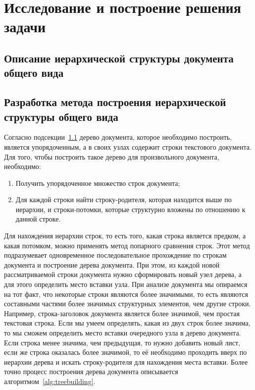 \section{Исследование и построение решения задачи}
\label{sec:Chapter3} 

\subsection{Описание иерархической структуры документа общего вида}
\label{subsec:structuredescription}

\subsection{Разработка метода построения иерархической структуры общего вида}
\label{subsec:extractmethod}

Согласно подсекции~\ref{subsec:structuredescription} дерево документа, которое необходимо построить,
является упорядоченным, а в своих узлах содержит строки текстового документа.
Для того, чтобы построить такое дерево для произвольного документа, необходимо:
\begin{enumerate}
    \item Получить упорядоченное множество строк документа;
    \item Для каждой строки найти строку-родителя, которая находится выше по иерархии, и строки-потомки, которые структурно вложены по отношению к данной строке.
\end{enumerate}
Для нахождения иерархии строк, то есть того, какая строка является предком, а какая потомком,
можно применять метод попарного сравнения строк.
Этот метод подразумевает одновременное последовательное прохождение по строкам документа и построение дерева документа.
При этом, из каждой новой рассматриваемой строки документа нужно сформировать новый узел дерева, а для этого определить место вставки узла.
При анализе документа мы опираемся на тот факт, что некоторые строки являются более значимыми,
то есть являются составными частями более значимых структурных элементов, чем другие строки.
Например, строка-заголовок документа является более значимой, чем простая текстовая строка.
Если мы умеем определять, какая из двух строк более значима, то мы сможем определить место вставки очередного узла в дерево документа.
Если строка менее значима, чем предыдущая, то нужно добавить новый лист, если же строка оказалась более значимой,
то её необходимо проходить вверх по иерархии дерева и искать строку-родителя для нахождения места вставки.
Более точно процесс построения дерева документа описывается алгоритмом~\ref{alg:treebuilding}.

